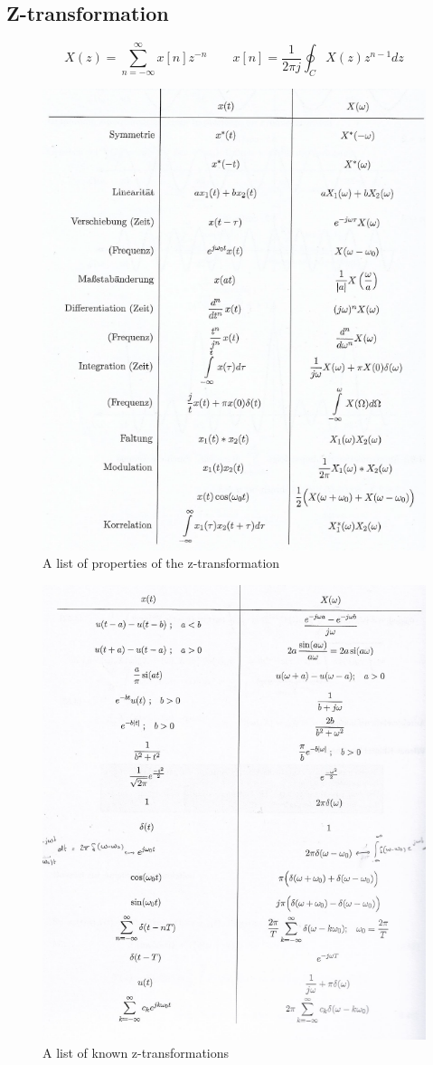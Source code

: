 \documentclass[10pt,a4paper]{article}
\begin{document}
\subsection{Z-transformation}
$$
X(z) = \sum_{n=-\infty}^{\infty} x[n] z^{-n} \qquad
x[n] = \frac{1}{2\pi j} \oint_C X(z)z^{n-1} dz
$$
\begin{figure}[H]
\centering
\includegraphics[scale=1]{FourierContProperties.PNG}
\caption{A list of properties of the z-transformation}
\label{FourierContProperties}
\end{figure}
\begin{figure}[H]
\centering
\includegraphics[scale=1]{FourierContIdentities.PNG}
\caption{A list of known z-transformations}
\end{figure}
\end{document}
